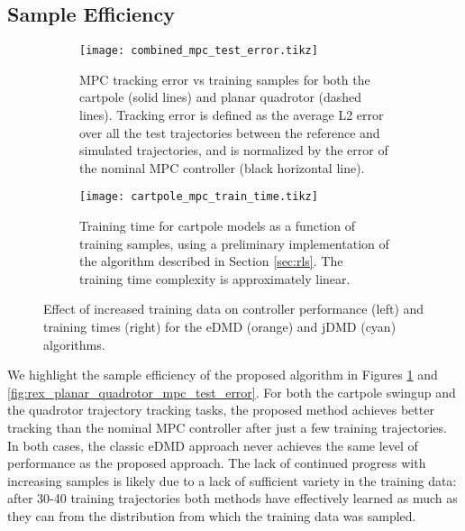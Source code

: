 \documentclass{article}
\begin{document}
\subsection{Sample Efficiency}
\begin{figure}[t]
  \centering
  \begin{subfigure}[t]{0.48\textwidth}
    \raggedleft
    \texttt{[image: combined\_mpc\_test\_error.tikz]}
    \caption{MPC tracking error vs training samples for both the cartpole (solid lines)
    and planar quadrotor (dashed lines). Tracking error
    is defined as the average L2 error over all the test trajectories between the reference
    and simulated trajectories, and is normalized by the error of the nominal MPC controller
    (black horizontal line).}
    \label{fig:cartpole_mpc_test_error}
  \end{subfigure}
  \hfill
  \begin{subfigure}[t]{0.48\textwidth}
    \texttt{[image: cartpole\_mpc\_train\_time.tikz]}
    \caption{Training time for cartpole models as a function of training samples, using a 
    preliminary implementation of the algorithm described in Section \ref{sec:rls}. The 
    training time complexity is approximately linear.}
    \label{fig:cartpole_train_time}
  \end{subfigure}
  \caption{Effect of increased training data on controller performance (left) and training 
  times (right) for the eDMD (orange) and jDMD (cyan) algorithms.}
\end{figure}




We highlight the sample efficiency of the proposed algorithm in Figures 
\ref{fig:cartpole_mpc_test_error} and \ref{fig:rex_planar_quadrotor_mpc_test_error}. For
both the cartpole swingup and the quadrotor trajectory tracking tasks, the proposed method
achieves better tracking than the nominal MPC controller after just a few training
trajectories. In both cases, the classic eDMD approach never achieves the same level of
performance as the proposed approach. The lack of continued progress with increasing samples
is likely due to a lack of sufficient variety in the training data: after 30-40 training
trajectories both methods have effectively learned as much as they can from the distribution
from which the training data was sampled.
\end{document}
